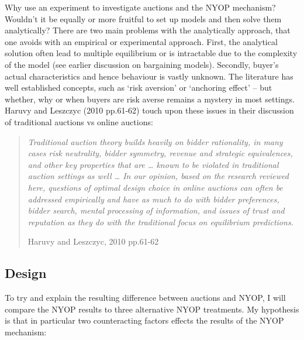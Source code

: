 \documentclass[a4paper,12pt]{article}
\begin{document}
	Why use an experiment to investigate auctions and the NYOP mechanism? Wouldn't it be equally or more fruitful to set up models and then solve them analytically? There are two main problems with the analytically approach, that one avoids with an empirical or experimental approach. First, the analytical solution often lead to multiple equilibrium or is intractable due to the complexity of the model (see earlier discussion on bargaining models). Secondly, buyer's actual characteristics and hence behaviour is vastly unknown. The literature has well established concepts, such as `risk aversion' or `anchoring effect' -- but whether, why or when buyers are risk averse remains a mystery in most settings. Haruvy and Leszczyc (2010 pp.61-62) touch upon these issues in their discussion of traditional auctions vs online auctions:
	\blockquote[Haruvy and Leszczyc, 2010 pp.61-62]{\emph{Traditional auction theory builds heavily on bidder rationality, in many cases risk neutrality, bidder symmetry, revenue and strategic equivalences, and other key properties that are … known to be violated in traditional auction settings as well … In our opinion, based on the research reviewed here, questions of optimal design choice in online auctions can often be addressed empirically and have as much to do with bidder preferences, bidder search, mental processing of information, and issues of trust and reputation as they do with the traditional focus on equilibrium predictions. }}


	\subsection{Design}

	To try and explain the resulting difference between auctions and NYOP, I will compare the NYOP results to three alternative NYOP treatments. My hypothesis is that in particular two counteracting factors effects the results of the NYOP mechanism:
\end{document}
